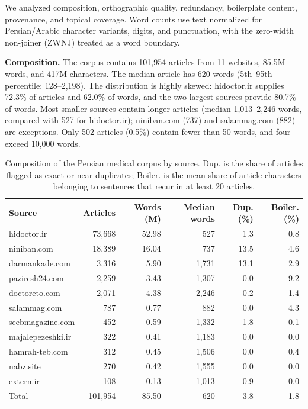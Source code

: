 \documentclass[manuscript,screen,review]{acmart}
\begin{document}
We analyzed composition, orthographic quality, redundancy, boilerplate content, provenance, and topical coverage. Word counts use text normalized for Persian/Arabic character variants, digits, and punctuation, with the zero-width non-joiner (ZWNJ) treated as a word boundary.

\textbf{Composition.} The corpus contains 101,954 articles from 11 websites, 85.5M words, and 417M characters. The median article has 620 words (5th--95th percentile: 128--2,198). The distribution is highly skewed: hidoctor.ir supplies 72.3\% of articles and 62.0\% of words, and the two largest sources provide 80.7\% of words. Most smaller sources contain longer articles (median 1,013--2,246 words, compared with 527 for hidoctor.ir); niniban.com (737) and salammag.com (882) are exceptions. Only 502 articles (0.5\%) contain fewer than 50 words, and four exceed 10,000 words.

\begin{table}[ht]
\caption{Composition of the Persian medical corpus by source. Dup. is the share of articles flagged as exact or near duplicates; Boiler. is the mean share of article characters belonging to sentences that recur in at least 20 articles.}\label{tab:corpus_sources}
\small
\begin{tabular}{@{}lrrrrr@{}}
\toprule
Source & Articles & Words (M) & Median words & Dup. (\%) & Boiler. (\%) \\
\midrule
hidoctor.ir & 73,668 & 52.98 & 527 & 1.3 & 0.8 \\
niniban.com & 18,389 & 16.04 & 737 & 13.5 & 4.6 \\
darmankade.com & 3,316 & 5.90 & 1,731 & 13.1 & 2.9 \\
paziresh24.com & 2,259 & 3.43 & 1,307 & 0.0 & 9.2 \\
doctoreto.com & 2,071 & 4.38 & 2,246 & 0.2 & 1.4 \\
salammag.com & 787 & 0.77 & 882 & 0.0 & 4.3 \\
seebmagazine.com & 452 & 0.59 & 1,332 & 1.8 & 0.1 \\
majalepezeshki.ir & 322 & 0.41 & 1,183 & 0.0 & 0.0 \\
hamrah-teb.com & 312 & 0.45 & 1,506 & 0.0 & 0.4 \\
nabz.site & 270 & 0.42 & 1,555 & 0.0 & 0.0 \\
extern.ir & 108 & 0.13 & 1,013 & 0.9 & 0.0 \\
\midrule
Total & 101,954 & 85.50 & 620 & 3.8 & 1.8 \\
\bottomrule
\end{tabular}
\end{table}
\end{document}
